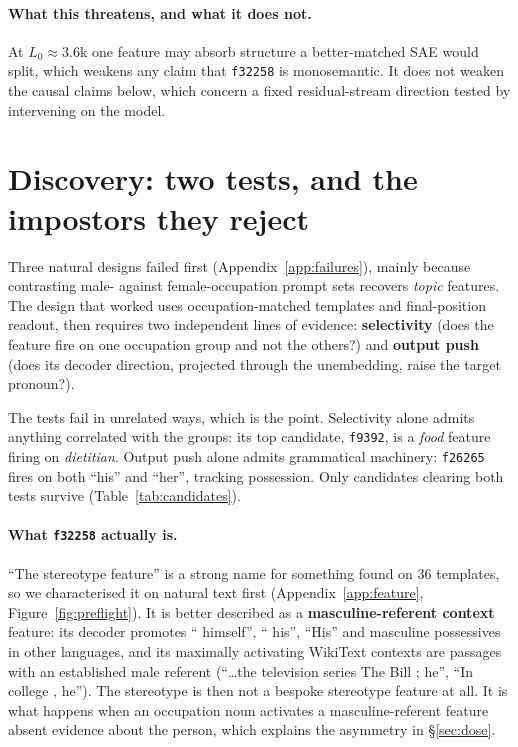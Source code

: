 \documentclass{article}
\newcommand{\ff}[1]{\texttt{f#1}}
\begin{document}
\paragraph{What this threatens, and what it does not.}
At $L_0\approx3.6$k one feature may absorb structure a better-matched SAE would split,
which weakens any claim that \ff{32258} is monosemantic. It does not weaken the causal
claims below, which concern a fixed residual-stream direction tested by intervening on
the model.

\section{Discovery: two tests, and the impostors they reject}
\label{sec:discovery}

Three natural designs failed first (Appendix~\ref{app:failures}), mainly because
contrasting male- against female-occupation prompt sets recovers \emph{topic} features.
The design that worked uses occupation-matched templates and final-position readout, then
requires two independent lines of evidence: \textbf{selectivity} (does the
feature fire on one occupation group and not the others?) and \textbf{output push} (does
its decoder direction, projected through the unembedding, raise the target pronoun?).

The tests fail in unrelated ways, which is the point. Selectivity alone admits anything
correlated with the groups: its top candidate, \ff{9392}, is a \emph{food} feature firing
on \emph{dietitian}. Output push alone admits grammatical machinery: \ff{26265} fires on
both ``his'' and ``her'', tracking possession. Only candidates clearing both tests survive
(Table~\ref{tab:candidates}).
\paragraph{What \ff{32258} actually is.}
``The stereotype feature'' is a strong name for something found on 36 templates, so we
characterised it on natural text first (Appendix~\ref{app:feature},
Figure~\ref{fig:preflight}). It is better described as a
\textbf{masculine-referent context} feature: its decoder promotes `` himself'', `` his'',
``His'' and masculine possessives in other languages, and its maximally activating WikiText
contexts are passages with an established male referent (``\dots{}the television series The
Bill ; he'', ``In college , he''). The stereotype is then not a bespoke stereotype feature
at all. It is what happens when an occupation noun activates a masculine-referent feature
absent evidence about the person, which explains the asymmetry in \S\ref{sec:dose}.
\end{document}
